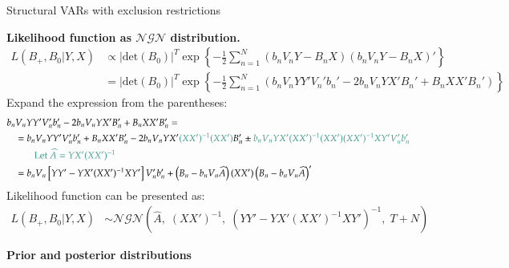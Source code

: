 \documentclass[notes,blackandwhite,mathsans,usenames,dvipsnames]{beamer}
\begin{document}
\begin{frame}{Structural VARs with exclusion restrictions}

\textbf{Likelihood function as $\mathcal{NGN}$ distribution.}\scriptsize
\begin{align*}
L(B_+,B_0|Y,X) &\propto  |\text{det}\left( B_0 \right)|^{T}\exp\left\{ -\frac{1}{2}\sum_{n=1}^N (b_nV_nY - B_n X)(b_nV_nY - B_n X)' \right\}\\
&= |\text{det}\left( B_0 \right)|^{T}\exp\left\{ -\frac{1}{2}\sum_{n=1}^N (b_nV_nYY'V_n'b_n' -2 b_nV_nYX'B_n' + B_nXX'B_n') \right\}
\end{align*}
\normalsize {\color{mcxs2}Expand the expression from the parentheses:}\tiny
\begin{align*}
b_n&V_nYY'V_n'b_n' -2 b_nV_nYX'B_n' + B_nXX'B_n' =\\
&= b_nV_nYY'V_n'b_n' + B_nXX'B_n' -2 b_nV_nYX'{\color{mcxs2}(XX')^{-1}(XX')}B_n' \pm {\color{mcxs2}b_nV_nYX'(XX')^{-1}(XX')(XX')^{-1}XY'V_n'b_n'}\\
&\qquad{\color{mcxs2}\text{Let } \widehat{A}=YX'(XX')^{-1}}\\
&= b_nV_n\left[YY' - YX'(XX')^{-1}XY'  \right]V_n'b_n' + \left(B_n - b_nV_n\widehat{A}\right)(XX')\left(B_n - b_nV_n\widehat{A}\right)'
\end{align*}
\normalsize {\color{mcxs2}Likelihood function can be presented as:}\small
\begin{align*}
L(B_+,B_0|Y,X) &\sim\mathcal{NGN}\left( \widehat{A},\; (XX')^{-1}, \;(YY' - YX'(XX')^{-1}XY')^{-1} ,\; T+N  \right)
\end{align*}

\end{frame}





{
\begin{frame}

\begin{adjustwidth}{-0.5cm}{0cm}
\vspace{8.3cm}\Large
\textbf{{\color{mcxs1}Prior and posterior} {\color{mcxs4}distributions}}
\end{adjustwidth}

\end{frame}
}
\end{document}
